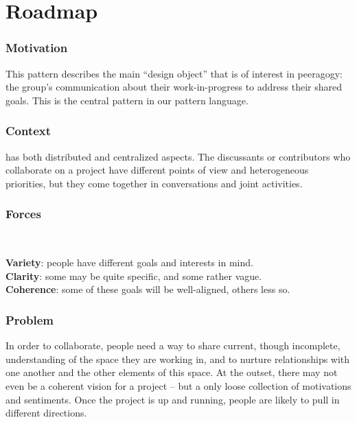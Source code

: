 \section{Roadmap} \label{sec:Roadmap}



\subsubsection*{Motivation} This pattern describes the main ``design object'' that is of interest in peeragogy: the group's communication about their work-in-progress to address their shared goals.  This is the central pattern in our pattern language. 


\subsubsection*{Context}  has both distributed and centralized aspects. The discussants or contributors who collaborate on a project have different points of view and heterogeneous priorities, but they come together in conversations and joint activities.

\subsubsection*{Forces}~
\parbox[t]{.85\textwidth}{
\textbf{Variety}: people have different goals and interests in mind.\\
\textbf{Clarity}: some may be quite specific, and some rather vague.\\
\textbf{Coherence}: some of these goals will be well-aligned, others less so.
}

\subsubsection*{Problem} In order to collaborate, people need a way to share current, though incomplete, understanding of the space they are working in, and to nurture relationships with one another and the other elements of this space.  At the outset, there may not even be a coherent vision for a project -- but a only loose collection of motivations and sentiments.  Once the project is up and running, people are likely to pull in different directions.   

